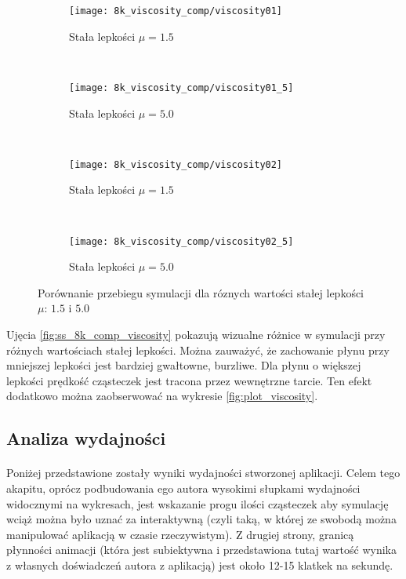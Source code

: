 \begin{figure}[H]
\centering     %

\begin{subfigure}[b]{0.45\textwidth}
\texttt{[image: 8k\_viscosity\_comp/viscosity01]}
\caption{Stała lepkości $\mu=1.5$}
\label{subfig:ss_8k_comp_viscosity_15_1}
\end{subfigure}
~
\begin{subfigure}[b]{0.45\textwidth}
\texttt{[image: 8k\_viscosity\_comp/viscosity01\_5]}
\caption{Stała lepkości $\mu=5.0$}
\label{subfig:ss_8k_comp_viscosity_50_1}
\end{subfigure}
\\
\vspace{1em}
\begin{subfigure}[b]{0.45\textwidth}
\texttt{[image: 8k\_viscosity\_comp/viscosity02]}
\caption{Stała lepkości $\mu=1.5$}
\label{subfig:ss_8k_comp_viscosity_15_2}
\end{subfigure}
~
\begin{subfigure}[b]{0.45\textwidth}
\texttt{[image: 8k\_viscosity\_comp/viscosity02\_5]}
\caption{Stała lepkości $\mu=5.0$}
\label{subfig:ss_8k_comp_viscosity_50_2}
\end{subfigure}

\caption{Porównanie przebiegu symulacji dla róznych wartości stałej lepkości $\mu$: $1.5$ i $5.0$}
\label{fig:ss_8k_comp_viscosity}
\end{figure}

\par
Ujęcia \eqref{fig:ss_8k_comp_viscosity} pokazują wizualne różnice w symulacji przy różnych wartościach stałej lepkości. Można zauważyć, że zachowanie płynu przy mniejszej lepkości jest bardziej gwałtowne, burzliwe. Dla płynu o większej lepkości prędkość cząsteczek jest tracona przez wewnętrzne tarcie. Ten efekt dodatkowo można zaobserwować na wykresie \eqref{fig:plot_viscosity}.

\subsection{Analiza wydajności}
\label{subsec:perf_anal}

\paragraph{}
Poniżej przedstawione zostały wyniki wydajności stworzonej aplikacji. Celem tego akapitu, oprócz podbudowania ego autora wysokimi słupkami wydajności widocznymi na wykresach, jest wskazanie progu ilości cząsteczek aby symulację wciąż można było uznać za interaktywną (czyli taką, w której ze swobodą można manipulować aplikacją w czasie rzeczywistym). Z drugiej strony, granicą płynności animacji (która jest subiektywna i przedstawiona tutaj wartość wynika z własnych doświadczeń autora z aplikacją) jest około 12-15 klatkek na sekundę.
\par


